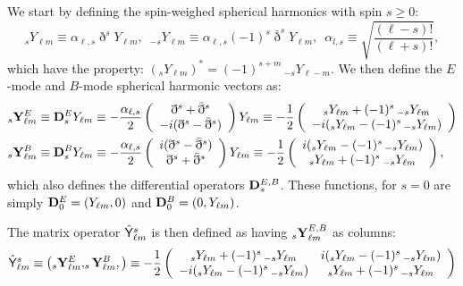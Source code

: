 \documentclass[a4paper,10pt]{article}
\begin{document}
  We start by defining the spin-weighed spherical harmonics with spin $s\geq0$:
  \begin{equation}
    _sY_{\ell m}\equiv \alpha_{\ell,s} \eth^s Y_{\ell m},\hspace{6pt}
    _{-s}Y_{\ell m}\equiv \alpha_{\ell,s} (-1)^s\bar{\eth}^s Y_{\ell m},\hspace{6pt}
    \alpha_{l,s}\equiv\sqrt{\frac{(\ell-s)!}{(\ell+s)!}},
  \end{equation}
  which have the property: $(_sY_{\ell m})^*=(-1)^{s+m}\,_{-s}Y_{\ell-m}$. We then define the $E$-mode and $B$-mode spherical harmonic vectors as:
  \begin{align}
    &_s{\bf Y}^E_{\ell m}\equiv {\bf D}^E_sY_{\ell m}
     \equiv-\frac{\alpha_{\ell,s}}{2}\left(\begin{array}{c}
                              \eth^s+\bar{\eth}^s\\
                              -i(\eth^s-\bar{\eth}^s)
                            \end{array}\right)Y_{\ell m}
     \equiv-\frac{1}{2}\left(\begin{array}{c}
                              _sY_{\ell m}+(-1)^s\,_{-s}Y_{\ell m}\\
                              -i(_sY_{\ell m}-(-1)^s\,_{-s}Y_{\ell m})
                            \end{array}\right) \\
    &_s{\bf Y}^B_{\ell m}\equiv {\bf D}^B_sY_{\ell m}
     \equiv-\frac{\alpha_{\ell,s}}{2}\left(\begin{array}{c}
                              i(\eth^s-\bar{\eth}^s)\\
                              \eth^s+\bar{\eth}^s
                            \end{array}\right)Y_{\ell m}
     \equiv-\frac{1}{2}\left(\begin{array}{c}
                              i(_sY_{\ell m}-(-1)^s\,_{-s}Y_{\ell m})\\
                              _sY_{\ell m}+(-1)^s\,_{-s}Y_{\ell m}
                            \end{array}\right),
  \end{align}
  which also defines the differential operators ${\bf D}^{E,B}_s$. These functions, for  $s=0$ are simply ${\bf D}^{E}_0=(Y_{\ell m},0)$ and ${\bf D}^{B}_0=(0,Y_{\ell m})$.
  
  The matrix operator $\hat{\sf Y}^s_{\ell m}$ is then defined as having $_s{\bf Y}^{E,B}_{\ell m}$ as columns:
  \begin{equation}
    \hat{\sf Y}^s_{\ell m}\equiv\left(_s{\bf Y}^E_{\ell m},_s{\bf Y}^B_{\ell m},\right)
    \equiv-\frac{1}{2}
    \left(\begin{array}{cc}
            _sY_{\ell m}+(-1)^s\,_{-s}Y_{\ell m}     & i(_sY_{\ell m}-(-1)^s\,_{-s}Y_{\ell m})\\                
            -i(_sY_{\ell m}-(-1)^s\,_{-s}Y_{\ell m}) & _sY_{\ell m}+(-1)^s\,_{-s}Y_{\ell m}                
          \end{array}\right)
  \end{equation}
\end{document}
